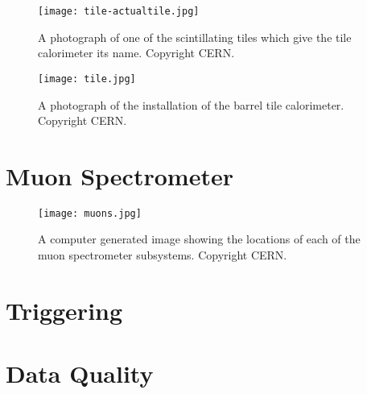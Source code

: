 
\begin{figure}
\centering
\texttt{[image: tile-actualtile.jpg]}
\label{fig:detector:trt}
\caption{A photograph of one of the scintillating tiles which give the tile calorimeter its name. Copyright CERN.}
\end{figure}



\begin{figure}
\centering
\texttt{[image: tile.jpg]}
\label{fig:detector:trt}
\caption{A photograph of the installation of the barrel tile calorimeter. Copyright CERN.}
\end{figure}



\section{Muon Spectrometer}



\begin{figure}
\centering
\texttt{[image: muons.jpg]}
\label{fig:detector:trt}
\caption{A computer generated image showing the locations of each of the muon spectrometer subsystems. Copyright CERN.}
\end{figure}


\section{Triggering}

\section{Data Quality}